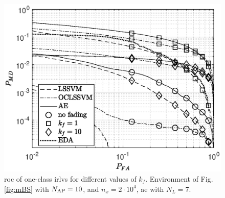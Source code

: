 \documentclass[draftcls,onecolumn,12pt]{IEEEtran}
\begin{document}
\begin{figure}[t]
    \centering
    \includegraphics[width=0.6\columnwidth]{res_Fading_new_10BS_oneClass.eps}
    \caption{\ac{roc} of one-class \acp{irlv} for different values of $k_f$. Environment of Fig. \ref{fig:mBS} with $N_{\rm AP}=10$, and $n_x= 2 \cdot 10^4$,  \ac{ae} with $N_L = 7$.  }
    \label{fig:kf10Oc}
\end{figure}





\end{document}
